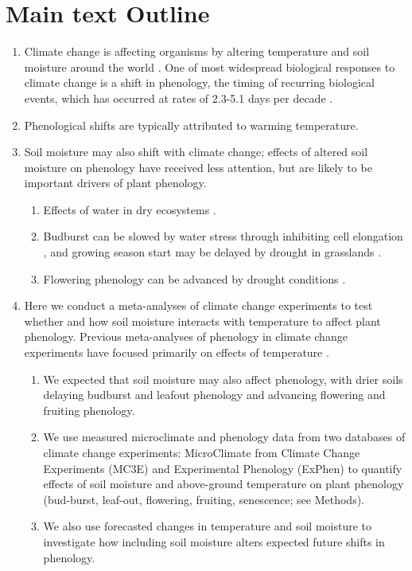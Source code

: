 \documentclass{article}
\begin{document}
\section* {Main text Outline}
\begin{enumerate}
\item Climate change is affecting organisms by altering temperature and soil moisture around the world \citep{parmesan2006,chen2010}. One of most widespread biological responses to climate change is a shift in phenology, the timing of recurring biological events, which has occurred at rates of 2.3-5.1 days per decade \citep{parmesan2006,poloczanska2013,root2003}.
\item Phenological shifts are typically attributed to warming temperature.
\item Soil moisture may also shift with climate change; effects of altered soil moisture on phenology have received less attention, but are likely to be important drivers of plant phenology. 
\begin{enumerate}
\item Effects of water in dry ecosystems \citep{essiamah1986,reich1984, van1993}. 
\item Budburst can be slowed by water stress through inhibiting cell elongation \citep{essiamah1986}, and growing season start may be delayed by drought in grasslands \cite{cui2017}. 
\item Flowering phenology can be advanced by drought conditions \citep{hamann2018}. 
\end{enumerate}
\item Here we conduct a meta-analyses of climate change experiments to test whether and how soil moisture interacts with temperature to affect plant phenology. Previous meta-analyses of phenology in climate change experiments have focused primarily on effects of temperature \citep{wolkovich2012}. 
\begin{enumerate}
\item We expected that soil moisture may also affect phenology, with drier soils delaying budburst and leafout phenology and advancing flowering and fruiting phenology.  
\item We use measured microclimate and phenology data from two databases of climate change experiments: MicroClimate from Climate Change Experiments (MC3E) and Experimental Phenology (ExPhen)  to quantify effects of soil moisture and above-ground temperature on plant phenology (bud-burst, leaf-out, flowering, fruiting, senescence; see Methods). 
\item We also use forecasted changes in temperature and soil moisture to investigate how including soil moisture alters expected future shifts in phenology. 

\end{enumerate}
\end{enumerate}
\end{document}
